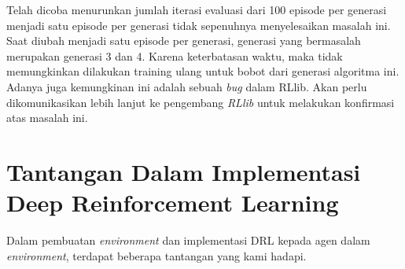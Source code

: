 Telah dicoba menurunkan jumlah iterasi evaluasi dari 100 episode per generasi menjadi satu episode per generasi tidak sepenuhnya menyelesaikan masalah ini.
Saat diubah menjadi satu episode per generasi, generasi yang bermasalah merupakan generasi 3 dan 4.
Karena keterbatasan waktu, maka tidak memungkinkan dilakukan training ulang untuk bobot dari generasi algoritma ini.
Adanya juga kemungkinan ini adalah sebuah \emph{bug} dalam RLlib.
Akan perlu dikomunikasikan lebih lanjut ke pengembang \emph{RLlib} untuk melakukan konfirmasi atas masalah ini.

\section{Tantangan Dalam Implementasi Deep Reinforcement Learning}
Dalam pembuatan \emph{environment} dan implementasi DRL kepada agen dalam \emph{environment},
terdapat beberapa tantangan yang kami hadapi.

